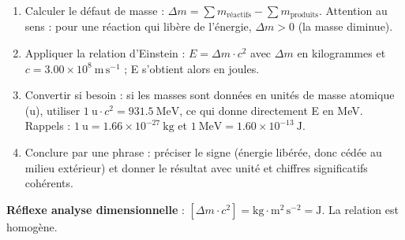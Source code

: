 \documentclass[11pt]{article}
\newcommand{\cle}[1]{{\popxbold\color{popdark}#1}}
\begin{document}
\begin{methode}[Exploiter $E_{\text{libérée}} = \Delta m \cdot c^{2}$]
\begin{enumerate}
\item \cle{Calculer le défaut de masse} : $\Delta m = \sum m_{\text{réactifs}} - \sum m_{\text{produits}}$. Attention au sens : pour une réaction qui libère de l'énergie, $\Delta m > 0$ (la masse diminue).
\item \cle{Appliquer la relation d'Einstein} : $E = \Delta m \cdot c^{2}$ avec $\Delta m$ en kilogrammes et $c = \num{3,00}\times 10^{8}\ \mathrm{m\,s^{-1}}$ ; E s'obtient alors en joules.
\item \cle{Convertir si besoin} : si les masses sont données en unités de masse atomique (u), utiliser $1\ \mathrm{u} \cdot c^{2} = \num{931,5}\ \mathrm{MeV}$, ce qui donne directement E en MeV. Rappels : $1\ \mathrm{u} = \num{1,66}\times 10^{-27}\ \mathrm{kg}$ et $1\ \mathrm{MeV} = \num{1,60}\times 10^{-13}\ \mathrm{J}$.
\item \cle{Conclure par une phrase} : préciser le signe (énergie libérée, donc cédée au milieu extérieur) et donner le résultat avec unité et chiffres significatifs cohérents.
\end{enumerate}
\textbf{Réflexe analyse dimensionnelle} : $[\Delta m \cdot c^{2}] = \mathrm{kg}\cdot\mathrm{m^{2}\,s^{-2}} = \mathrm{J}$. La relation est homogène.
\end{methode}
\end{document}
